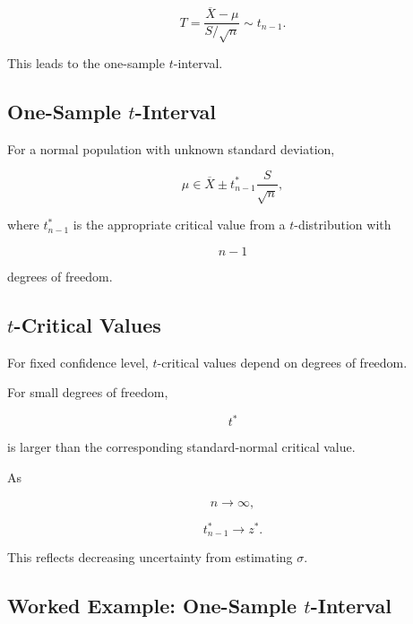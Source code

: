 \[
\boxed{
T
=
\frac{
\overline{X}-\mu
}{
S/\sqrt{n}
}
\sim
t_{n-1}.
}
\]

This leads to the one-sample \(t\)-interval.

\subsection{One-Sample \(t\)-Interval}
\label{subsec:one-sample-t-interval}

For a normal population with unknown standard deviation,

\[
\boxed{
\mu
\in
\overline{X}
\pm
t^*_{n-1}
\frac{S}{\sqrt{n}},
}
\]

where \(t^*_{n-1}\) is the appropriate critical value from a
\(t\)-distribution with

\[
n-1
\]

degrees of freedom.

\subsection{\(t\)-Critical Values}
\label{subsec:t-critical-values}

For fixed confidence level, \(t\)-critical values depend on degrees of
freedom.

For small degrees of freedom,

\[
t^*
\]

is larger than the corresponding standard-normal critical value.

As

\[
n\to\infty,
\]

\[
\boxed{
t^*_{n-1}
\to
z^*.
}
\]

This reflects decreasing uncertainty from estimating \(\sigma\).

\subsection{Worked Example: One-Sample \(t\)-Interval}
\label{subsec:worked-one-sample-t-ci}

